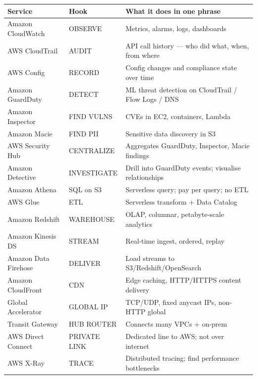 \begin{comparebox}[title={Single-word memory hooks for exam day}]
\begin{tabular}{@{}p{4.5cm}p{2.5cm}p{5cm}@{}}
\toprule
\textbf{Service} & \textbf{Hook} & \textbf{What it does in one phrase} \\
\midrule
Amazon CloudWatch     & OBSERVE    & Metrics, alarms, logs, dashboards \\[3pt]
AWS CloudTrail        & AUDIT      & API call history --- who did what, when, from where \\[3pt]
AWS Config            & RECORD     & Config changes and compliance state over time \\[3pt]
Amazon GuardDuty      & DETECT     & ML threat detection on CloudTrail / Flow Logs / DNS \\[3pt]
Amazon Inspector      & FIND VULNS & CVEs in EC2, containers, Lambda \\[3pt]
Amazon Macie          & FIND PII   & Sensitive data discovery in S3 \\[3pt]
AWS Security Hub      & CENTRALIZE & Aggregates GuardDuty, Inspector, Macie findings \\[3pt]
Amazon Detective      & INVESTIGATE & Drill into GuardDuty events; visualise relationships \\[3pt]
Amazon Athena         & SQL on S3  & Serverless query; pay per query; no ETL \\[3pt]
AWS Glue              & ETL        & Serverless transform + Data Catalog \\[3pt]
Amazon Redshift       & WAREHOUSE  & OLAP, columnar, petabyte-scale analytics \\[3pt]
Amazon Kinesis DS     & STREAM     & Real-time ingest, ordered, replay \\[3pt]
Amazon Data Firehose  & DELIVER    & Load streams to S3/Redshift/OpenSearch \\[3pt]
Amazon CloudFront     & CDN        & Edge caching, HTTP/HTTPS content delivery \\[3pt]
Global Accelerator    & GLOBAL IP  & TCP/UDP, fixed anycast IPs, non-HTTP global \\[3pt]
Transit Gateway       & HUB ROUTER & Connects many VPCs + on-prem \\[3pt]
AWS Direct Connect    & PRIVATE LINK & Dedicated line to AWS; not over internet \\[3pt]
AWS X-Ray             & TRACE      & Distributed tracing; find performance bottlenecks \\[3pt]
\bottomrule
\end{tabular}
\end{comparebox}
